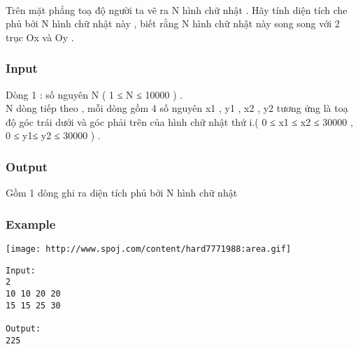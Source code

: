 

 

Trên mặt phẳng toạ độ người ta vẽ ra N hình chữ nhật . Hãy tính diện tích che phủ bởi N hình chữ nhật này , biết rằng N hình chữ nhật này song song với 2 trục Ox và Oy .

\subsubsection{Input}

Dòng 1 : số nguyên N ( 1 ≤ N ≤ 10000 ) .
\\N dòng tiếp theo , mỗi dòng gồm 4 số nguyên x1 , y1 , x2 , y2 tương ứng là toạ độ góc trái dưới và góc phải trên của hình chữ nhật thứ i.( 0 ≤ x1 ≤ x2 ≤ 30000 , 0 ≤ y1≤ y2 ≤ 30000 ) .

\subsubsection{Output}

Gồm 1 dòng ghi ra diện tích phủ bởi N hình chữ nhật

\subsubsection{Example}


\texttt{[image: http://www.spoj.com/content/hard7771988:area.gif]}
\begin{verbatim}
Input:
2
10 10 20 20
15 15 25 30

Output:
225 

\end{verbatim}